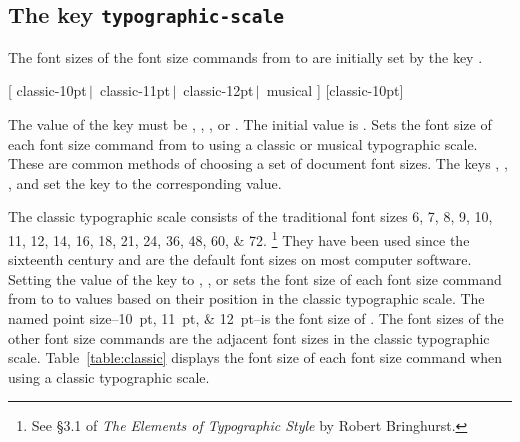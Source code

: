 \documentclass{beery}
\begin{document}
\subsection
  {%
    The key
    \texorpdfstring
      {\texttt{typographic-scale}}
      {typographic-scale}%
  }
\label{subsec:typographicscale}

The font sizes of the font size commands from  to  are initially set by the key .

\begin{mydisplaycode}
    [%
      classic-10pt$\,\vert\,$\allowbreak
      classic-11pt$\,\vert\,$\allowbreak
      classic-12pt$\,\vert\,$\allowbreak\hspace*{1.5em}%
      musical%
    ]
    [classic-10pt]
  \newline
  \newline
  \newline
  \nopagebreak\newline
\end{mydisplaycode}

The value of the key  must be , , , or .
The initial value is .
Sets the font size of each font size command from  to  using a classic or musical typographic scale.
These are common methods of choosing a set of document font sizes.
The keys , , , and  set the key  to the corresponding value.

The classic typographic scale consists of the traditional font sizes
\numlist{6;7;8;9;10;11;12;14;16;18;21;24;36;48;60;72}.%
\footnote{See \S3.1 of \textit{The Elements of Typographic Style} by Robert Bringhurst.}
They have been used since the sixteenth century and are the default font sizes on most computer software.
Setting the value of the key  to , , or  sets the font size of each font size command from  to  to values based on their position in the classic typographic scale.
The named point size\---\qtylist[list-final-separator={, or }]{10;11;12}{pt}\---is the font size of .
The font sizes of the other font size commands are the adjacent font sizes in the classic typographic scale.
Table~\ref{table:classic} displays the font size of each font size command when using a classic typographic scale.
\end{document}
